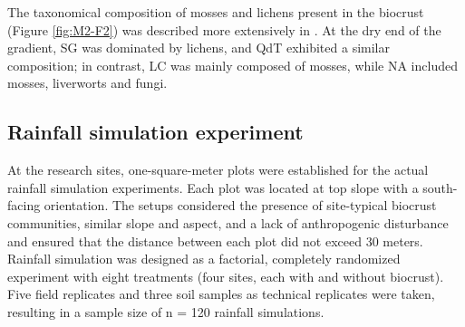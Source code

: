 The taxonomical composition of mosses and lichens present in the biocrust (Figure \ref{fig:M2-F2}) was described more extensively in \citep{RiverasMunoz2022}. At the dry end of the gradient, SG was dominated by lichens, and QdT exhibited a similar composition; in contrast, LC was mainly composed of mosses, while NA included mosses, liverworts and fungi.

\subsection{Rainfall simulation experiment}

At the research sites, one-square-meter plots were established for the actual rainfall simulation experiments. Each plot was located at top slope with a south-facing orientation. The setups considered the presence of site-typical biocrust communities, similar slope and aspect, and a lack of anthropogenic disturbance and ensured that the distance between each plot did not exceed 30 meters. Rainfall simulation was designed as a factorial, completely randomized experiment with eight treatments (four sites, each with and without biocrust). Five field replicates and three soil samples as technical replicates were taken, resulting in a sample size of n = 120 rainfall simulations.

